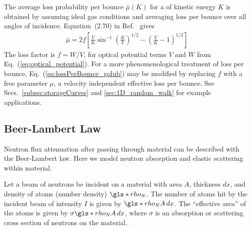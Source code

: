 The average loss probability per bounce $\bar{\mu}(K)$ for a \ucn of kinetic energy $K$ is obtained by assuming ideal gas conditions and averaging loss per bounce over all angles of incidence. Equation~(2.70) in Ref.~\cite{golubUCN} gives
%
\begin{gather}
    \bar{\mu} = 2f \left[ \frac{V}{K} \sin^{-1}\left( \frac{K}{V}\right)^{1/2} -\left( \frac{V}{K} - 1 \right)^{1/2} \right] \label{eq:lossPerBounce_golub}
\end{gather}
%
The loss factor is $f=W/V$, for optical potential terms $V$ and $W$ from Eq.~(\ref{eq:optical_potential}). For a more phenomenological treatment of loss per bounce, Eq.~(\ref{eq:lossPerBounce_golub}) may be modified by replacing $f$ with a free parameter $\mu$, a velocity independent effective loss per bounce. See Secs.~\ref{subsec:storageCurves} and \ref{sec:1D_random_walk} for example applications.


\subsection{Beer-Lambert Law}\label{sec:beer_lambert_law}


Neutron flux attenuation after passing through material can be described with the Beer-Lambert law. Here we model neutron absorption and elastic scattering within material.

Let a beam of neutrons be incident on a material with area $A$, thickness $dx$, and density of atoms (number density) $\gls*{rho_N}$. The number of atoms hit by the incident beam of intensity $I$ is given by $\gls*{rho_N} A\,dx$. The ``effective area'' of the atoms is given by $\sigma \gls*{rho_N} A \, dx$, where $\sigma$ is an absorption or scattering cross section of neutrons on the material.


